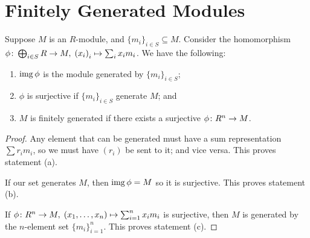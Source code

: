 \section{Finitely Generated Modules}

\begin{proposition}
    Suppose \(M\) is an \(R\)-module, and \({\{m_i\}}_{i \in S} \subseteq M\).
    Consider the homomorphism \(\phi\colon\bigoplus_{i \in S} R\to M,\;{(x_i)}_i\mapsto\sum_i x_i m_i\).
    We have the following:
    \begin{enumerate}[label={(\alph*)}, itemsep=0mm]
        \item \(\operatorname{img}\phi\) is the module generated by \({\{m_i\}}_{i \in S}\);
        \item \(\phi\) is surjective if \({\{m_i\}}_{i \in S}\) generate \(M\); and
        \item \(M\) is finitely generated if there exists a surjective \(\phi\colon R^n\to M\).
    \end{enumerate}
\end{proposition}
\begin{proof}
    Any element that can be generated must have a sum representation \(\sum r_i m_i\),
    so we must have \((r_i)\) be sent to it; and vice versa.
    This proves statement (a).

    If our set generates \(M\), then \(\operatorname{img}\phi = M\) so it is surjective.
    This proves statement (b).

    If \(\phi\colon R^n\to M,\;(x_1,\hdots,x_n)\mapsto\sum_{i=1}^n x_i m_i\) is surjective,
    then \(M\) is generated by the \(n\)-element set \({\{m_i\}}_{i=1}^n\).
    This proves statement (c).
\end{proof}

